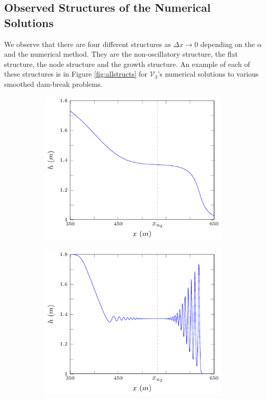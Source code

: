 \documentclass[times]{elsarticle}
\begin{document}
\subsection{Observed Structures of the Numerical Solutions}
We observe that there are four different structures as $\Delta x \rightarrow 0$ depending on the $\alpha$ and the numerical method. They are the non-oscillatory structure, the flat structure, the node structure and the growth structure. An example of each of these structures is in Figure \ref{fig:allstructs} for $\mathcal{V}_3$'s numerical solutions to various smoothed dam-break problems. 

\begin{figure}
	\centering
	\begin{subfigure}{0.5\textwidth}
		\includegraphics[width=\textwidth]{pics/results/SDB/structs/non.pdf}
	\end{subfigure}%
	\begin{subfigure}{0.5\textwidth}
		\includegraphics[width=\textwidth]{pics/results/SDB/structs/flat.pdf}

\end{subfigure}
\end{figure}
\end{document}
